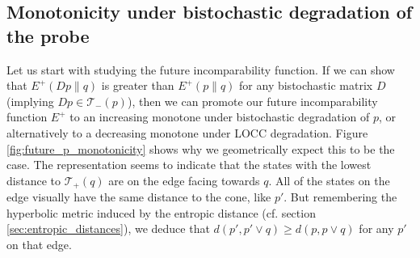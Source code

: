 \subsection{Monotonicity under bistochastic degradation of the probe} \label{sec:p_monotonicity}

Let us start with studying the future incomparability function. If we can show that $E^+(Dp \parallel q)$ is greater than $E^+(p \parallel q)$ for any bistochastic matrix $D$ (implying $Dp \in \mathcal{T}_-(p)$), then we can promote our future incomparability function $E^+$ to an increasing monotone under bistochastic degradation of $p$, or alternatively to a decreasing monotone under LOCC degradation. Figure \ref{fig:future_p_monotonicity} shows why we geometrically expect this to be the case. The representation seems to indicate that the states with the lowest distance to $\mathcal{T}_+(q)$ are on the edge facing towards $q$. All of the states on the edge visually have the same distance to the cone, like $p'$. But remembering the hyperbolic metric induced by the entropic distance (cf. section \ref{sec:entropic_distances}), we deduce that $d(p', p' \vee q) \geq d(p, p \vee q)$ for any $p'$ on that edge.

